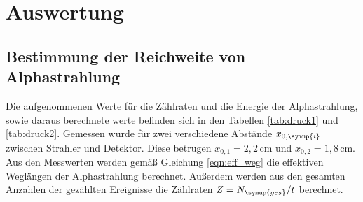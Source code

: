 \section{Auswertung}
\label{sec:Auswertung}

\subsection{Bestimmung der Reichweite von Alphastrahlung}
\label{subsec:reichweite}

Die aufgenommenen Werte für die Zählraten und die Energie der Alphastrahlung, sowie
daraus berechnete werte befinden sich in den Tabellen \ref{tab:druck1} und \ref{tab:druck2}.
Gemessen wurde für zwei verschiedene Abstände $x_{0,\symup{i}}$ zwischen Strahler und
Detektor. Diese betrugen $x_{0,1}=2{,}2\,$cm und $x_{0,2}=1{,}8\,$cm.
Aus den Messwerten werden gemäß Gleichung \eqref{eqn:eff_weg} die effektiven
Weglängen der Alphastrahlung berechnet. Außerdem werden aus den gesamten Anzahlen
der gezählten Ereignisse die Zählraten $Z=N_{\symup{ges}}/t$ berechnet.
